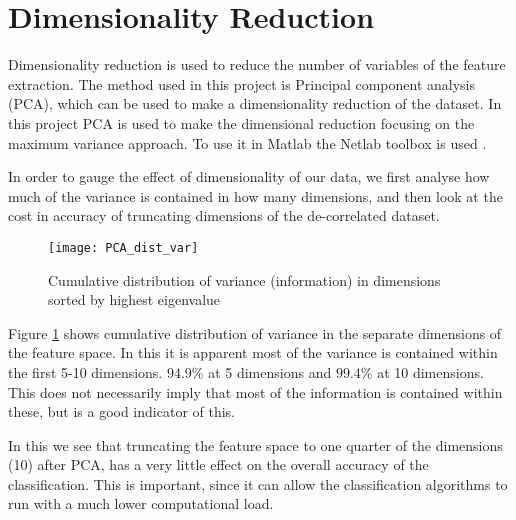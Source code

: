\section*{Dimensionality Reduction}
Dimensionality reduction is used to reduce the number of variables of the feature extraction.
The method used in this project is Principal component analysis (PCA), which can be used to make a dimensionality reduction of the dataset.
In this project PCA is used to make the dimensional reduction focusing on the maximum variance approach.
To use it in Matlab the Netlab toolbox is used \cite{Netlab}.  

In order to gauge the effect of dimensionality of our data, we first analyse how much of the variance is contained in how many dimensions, and then look at the cost in accuracy of truncating dimensions of the de-correlated dataset.

\begin{figure}[H]
\centering
\texttt{[image: PCA\_dist\_var]}
\caption{Cumulative distribution of variance (information) in dimensions sorted by highest eigenvalue}
\label{fig:PCA_dist_rap}
\end{figure}

Figure \ref{fig:PCA_dist_rap} shows cumulative distribution of variance in the separate dimensions of the feature space.
In this it is apparent most of the variance is contained within the first 5-10 dimensions. 
$ 94.9 \% $ at 5 dimensions and $ 99.4 \% $ at 10 dimensions.
This does not necessarily imply that most of the information is contained within these, but is a good indicator of this.

In this we see that truncating the feature space to one quarter of the dimensions (10) after PCA, has a very little effect on the overall accuracy of the classification.
This is important, since it can allow the classification algorithms to run with a much lower computational load.

